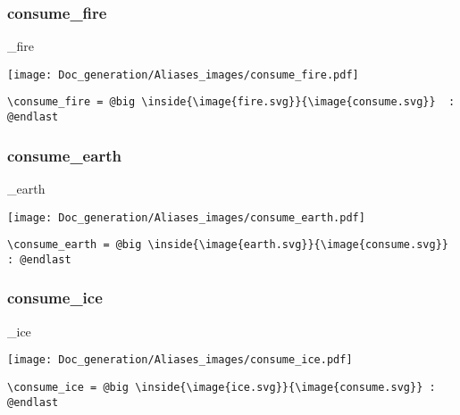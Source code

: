 \documentclass{article}
\begin{document}
\subsubsection{consume\_fire}
\begin{minipage}{0.45\linewidth}
\raggedright
\begin{spverbatim}
\consume_fire 
\end{spverbatim}
\end{minipage}
\begin{minipage}{0.45\linewidth}
\raggedleft
\texttt{[image: Doc\_generation/Aliases\_images/consume\_fire.pdf]}
\end{minipage}
\begin{center}
\begin{BVerbatim}
\consume_fire = @big \inside{\image{fire.svg}}{\image{consume.svg}}  : @endlast
\end{BVerbatim}
\end{center}

\subsubsection{consume\_earth}
\begin{minipage}{0.45\linewidth}
\raggedright
\begin{spverbatim}
\consume_earth 
\end{spverbatim}
\end{minipage}
\begin{minipage}{0.45\linewidth}
\raggedleft
\texttt{[image: Doc\_generation/Aliases\_images/consume\_earth.pdf]}
\end{minipage}
\begin{center}
\begin{BVerbatim}
\consume_earth = @big \inside{\image{earth.svg}}{\image{consume.svg}} : @endlast
\end{BVerbatim}
\end{center}

\subsubsection{consume\_ice}
\begin{minipage}{0.45\linewidth}
\raggedright
\begin{spverbatim}
\consume_ice 
\end{spverbatim}
\end{minipage}
\begin{minipage}{0.45\linewidth}
\raggedleft
\texttt{[image: Doc\_generation/Aliases\_images/consume\_ice.pdf]}
\end{minipage}
\begin{center}
\begin{BVerbatim}
\consume_ice = @big \inside{\image{ice.svg}}{\image{consume.svg}} : @endlast
\end{BVerbatim}
\end{center}
\end{document}
